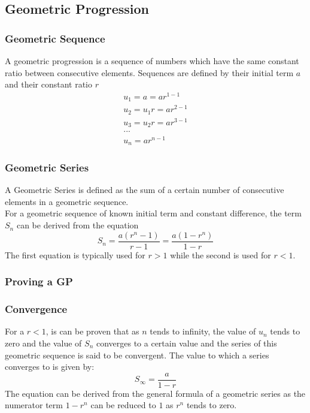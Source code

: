 \documentclass[../main]{subfiles}
\begin{document}
\subsection{Geometric Progression}
	
	\subsubsection{Geometric Sequence}
	A geometric progression is a sequence of numbers which have the same constant ratio between consecutive elements. Sequences are defined by their initial term \(a\) and their constant ratio \(r\)
	\begin{equation*} \begin{gathered}
		u_1 = a = ar^{1-1}\\
		u_2 = u_1r = ar^{2-1}\\
		u_3 = u_2r = ar^{3-1} \\
		...\\
		u_n = ar^{n-1}
	\end{gathered} \end{equation*} 
	\subsubsection{Geometric Series}
	A Geometric Series is defined as the sum of a certain number of consecutive elements in a geometric sequence. \\
	For a geometric sequence of known initial term and constant difference, the term \(S_n\) can be derived from the equation
	\[ S_n = \frac{a(r^n-1)}{r-1} = \frac{a(1-r^n)}{1-r} \]
	The first equation is typically used for \(r>1\) while the second is used for \(r<1\).
	\subsubsection{Proving a GP}
	\subsubsection{Convergence}
	For a \(r<1\), is can be proven that as \(n\) tends to infinity, the value of \(u_n\) tends to zero and the value of \(S_n\) converges to a certain value and the series of this geometric sequence is said to be convergent. The value to which a series converges to is given by:
	\[ S_{\infty} = \frac{a}{1-r} \]
	The equation can be derived from the general formula of a geometric series as the numerator term \(1-r^n\) can be reduced to \(1\) as \(r^n\) tends to zero.
\end{document}

